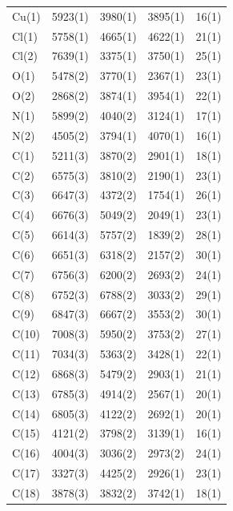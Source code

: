 \twocolumn
\begin{center}
\tablelasttail{\bottomrule}
 {\footnotesize \singlespacing
\begin{supertabular}{lcccc}
Cu(1)&5923(1)&3980(1)&3895(1)&16(1)\\
Cl(1)&5758(1)&4665(1)&4622(1)&21(1)\\
Cl(2)&7639(1)&3375(1)&3750(1)&25(1)\\
O(1)&5478(2)&3770(1)&2367(1)&23(1)\\
O(2)&2868(2)&3874(1)&3954(1)&22(1)\\
N(1)&5899(2)&4040(2)&3124(1)&17(1)\\
N(2)&4505(2)&3794(1)&4070(1)&16(1)\\
C(1)&5211(3)&3870(2)&2901(1)&18(1)\\
C(2)&6575(3)&3810(2)&2190(1)&23(1)\\
C(3)&6647(3)&4372(2)&1754(1)&26(1)\\
C(4)&6676(3)&5049(2)&2049(1)&23(1)\\
C(5)&6614(3)&5757(2)&1839(2)&28(1)\\
C(6)&6651(3)&6318(2)&2157(2)&30(1)\\
C(7)&6756(3)&6200(2)&2693(2)&24(1)\\
C(8)&6752(3)&6788(2)&3033(2)&29(1)\\
C(9)&6847(3)&6667(2)&3553(2)&30(1)\\
C(10)&7008(3)&5950(2)&3753(2)&27(1)\\
C(11)&7034(3)&5363(2)&3428(1)&22(1)\\
C(12)&6868(3)&5479(2)&2903(1)&21(1)\\
C(13)&6785(3)&4914(2)&2567(1)&20(1)\\
C(14)&6805(3)&4122(2)&2692(1)&20(1)\\
C(15)&4121(2)&3798(2)&3139(1)&16(1)\\
C(16)&4004(3)&3036(2)&2973(2)&24(1)\\
C(17)&3327(3)&4425(2)&2926(1)&23(1)\\
C(18)&3878(3)&3832(2)&3742(1)&18(1)\\

\end{supertabular}}
\end{center}
